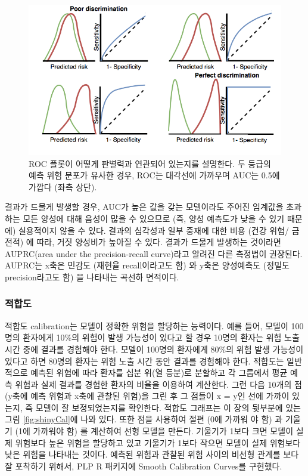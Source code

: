\documentclass[10.5pt]{book}
\theoremstyle{definition}
\theoremstyle{definition}
\theoremstyle{definition}
\theoremstyle{remark}
\begin{document}
\begin{figure}
\includegraphics[width=1\linewidth]{images/PatientLevelPrediction/theory/roctheory} \caption{ROC 플롯이 어떻게 판별력과 연관되어 있는지를 설명한다. 두 등급의 예측 위험 분포가 유사한 경우, ROC는 대각선에 가까우며 AUC는 0.5에 가깝다 (좌측 상단).}\label{fig:figuretheoryroctheory}
\end{figure}

결과가 드물게 발생할 경우, AUC가 높은 값을 갖는 모델이라도 주어진
임계값을 초과하는 모든 양성에 대해 음성이 많을 수 있으므로 (즉, 양성
예측도가 낮을 수 있기 때문에) 실용적이지 않을 수 있다. 결과의 심각성과
일부 중재에 대한 비용 (건강 위험/ 금전적) 에 따라, 거짓 양성비가 높아질
수 있다. 결과가 드물게 발생하는 것이라면 AUPRC(area under the
precision-recall curve)라고 알려진 다른 측정법이 권장된다. AUPRC는 x축은
민감도 (재현율 recall이라고도 함) 와 y축은 양성예측도 (정밀도
precision라고도 함) 을 나타내는 곡선하 면적이다.

\subsubsection*{적합도}

적합도 calibration는 모델이 정확한 위험을 할당하는 능력이다. 예를 들어,
모델이 100명의 환자에게 10\%의 위험이 발생 가능성이 있다고 할 경우
10명의 환자는 위험 노출 시간 중에 결과를 경험해야 한다. 모델이 100명의
환자에게 80\%의 위험 발생 가능성이 있다고 하면 80명의 환자는 위험 노출
시간 동안 결과를 경험해야 한다. 적합도는 일반적으로 예측된 위험에 따라
환자를 십분 위(열 등분)로 분할하고 각 그룹에서 평균 예측 위험과 실제
결과를 경험한 환자의 비율을 이용하여 계산한다. 그런 다음 10개의 점
(y축에 예측 위험과 x축에 관찰된 위험)을 그린 후 그 점들이 x = y인 선에
가까이 있는지, 즉 모델이 잘 보정되었는지를 확인한다. 적합도 그래프는 이
장의 뒷부분에 있는 그림 \ref{fig:shinyCal}에 나와 있다. 또한 점을
사용하여 절편 (0에 가까워 야 함) 과 기울기 (1에 가까워야 함) 를 계산하여
선형 모델을 만든다. 기울기가 1보다 크면 모델이 실제 위험보다 높은 위험을
할당하고 있고 기울기가 1보다 작으면 모델이 실제 위험보다 낮은 위험을
나타내는 것이다. 예측된 위험과 관찰된 위험 사이의 비선형 관계를 보다 잘
포착하기 위해서, PLP R 패키지에 Smooth Calibration Curves를 구현했다.
\end{document}
